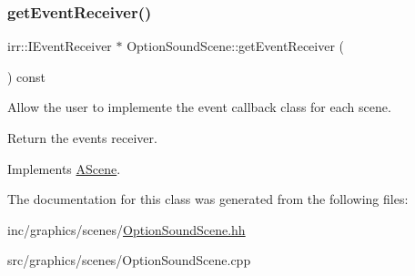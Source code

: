 \subsubsection{\texorpdfstring{get\+Event\+Receiver()}{getEventReceiver()}}
{\footnotesize\ttfamily irr\+::\+I\+Event\+Receiver $\ast$ Option\+Sound\+Scene\+::get\+Event\+Receiver (\begin{DoxyParamCaption}{ }\end{DoxyParamCaption}) const\hspace{0.3cm}{\ttfamily [virtual]}}



Allow the user to implemente the event callback class for each scene. 

Return the event\textquotesingle{}s receiver. 

Implements \hyperlink{classAScene_af521e5e6d30a5d2e5d30eb333e4d3abd}{A\+Scene}.



The documentation for this class was generated from the following files\+:\begin{DoxyCompactItemize}
\item 
inc/graphics/scenes/\hyperlink{OptionSoundScene_8hh}{Option\+Sound\+Scene.\+hh}\item 
src/graphics/scenes/Option\+Sound\+Scene.\+cpp\end{DoxyCompactItemize}
